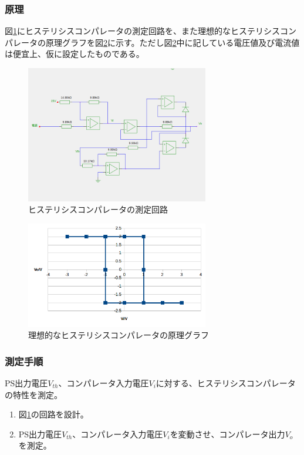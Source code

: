 \documentclass[11pt,a4j]{jsarticle}
\begin{document}
   \subsubsection{原理}
    
    図\ref{fig:histeri_tokusei}にヒステリシスコンパレータの測定回路を、また理想的なヒステリシスコンパレータの原理グラフを図\ref{fig:risou_histeri}に示す。ただし図\ref{fig:risou_histeri}中に記している電圧値及び電流値は便宜上、仮に設定したものである。
    
    \begin{figure}[htbp]
  \centering
  \includegraphics[width=8cm,clip]{histeri_tokusei.png}
  \caption{ヒステリシスコンパレータの測定回路}
  \label{fig:histeri_tokusei}
 \end{figure}%
    
    \begin{figure}[htbp]
  \centering
  \includegraphics[width=8cm,clip]{risou_histeri.png}
  \caption{理想的なヒステリシスコンパレータの原理グラフ}
  \label{fig:risou_histeri}
 \end{figure}
    
   \subsubsection{測定手順}
    PS出力電圧$V_{th}$、コンパレータ入力電圧$V_i$に対する、ヒステリシスコンパレータの特性を測定。
    \begin{enumerate}
    \item 図\ref{fig:histeri_tokusei}の回路を設計。
    \item PS出力電圧$V_{th}$、コンパレータ入力電圧$V_i$を変動させ、コンパレータ出力$V_o$を測定。
    \end{enumerate}
    
\end{document}
